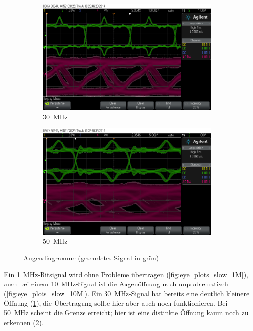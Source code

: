 \documentclass[12pt,a4paper]{article}
\begin{document}
\begin{figure}[H]
  \centering
  \begin{subfigure}[b]{0.6\textwidth}
    \includegraphics[width=\textwidth]{../measurements/20140710/eye_plots/30MHz.png}
    \caption{\SI{30}{\mega\hertz}}
    \label{fig:eye_plots_fast_30M}
  \end{subfigure}
  \begin{subfigure}[b]{0.6\textwidth}
    \includegraphics[width=\textwidth]{../measurements/20140710/eye_plots/50MHz.png}
    \caption{\SI{50}{\mega\hertz}}
    \label{fig:eye_plots_fast_50M}
  \end{subfigure}  
  \caption{Augendiagramme (gesendetes Signal in grün)}
  \label{fig:eye_plots_fast}
\end{figure}


Ein \SI{1}{\mega\hertz}-Bitsignal wird ohne Probleme übertragen (\ref{fig:eye_plots_slow_1M}), auch bei einem \SI{10}{\mega\hertz}-Signal ist die Augenöffnung noch unproblematisch (\ref{fig:eye_plots_slow_10M}). Ein \SI{30}{\mega\hertz}-Signal hat bereits eine deutlich kleinere Öffnung (\ref{fig:eye_plots_fast_30M}), die Übertragung sollte hier aber auch noch funktionieren. Bei \SI{50}{\mega\hertz} scheint die Grenze erreicht; hier ist eine distinkte Öffnung kaum noch zu erkennen (\ref{fig:eye_plots_fast_50M}). 
\end{document}
